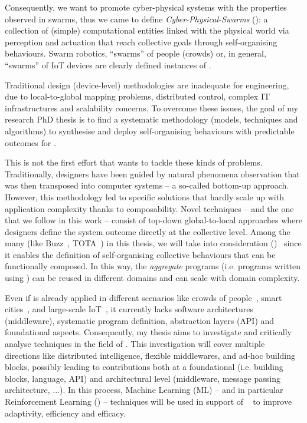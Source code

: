 \documentclass[11pt]{article}
\begin{document}
Consequently, we want to promote cyber-physical systems with the properties observed in swarms, thus we came to define \textit{Cyber-Physical-Swarms} (\cpsw{}): a collection of (simple) computational entities linked with the physical world via perception and actuation that reach collective goals through self-organising behaviours.
%
Swarm robotics, ``swarms” of people (crowds) or, in general, ``swarms” of IoT devices are clearly defined instances of \cpsw{}.

Traditional design (device-level) methodologies are inadequate for \cpsw{} engineering, due to local-to-global mapping problems, distributed control, complex IT infrastructures and scalability concerns.
%
To overcome these issues, the goal of my research PhD thesis is to find a systematic methodology (models, techniques and algorithms) to synthesise and deploy self-organising behaviours with predictable outcomes for \cpsw{}.

This is not the first effort that wants to tackle these kinds of problems. Traditionally, designers have been guided by natural phenomena observation that was then transposed into computer systems -- a so-called
bottom-up approach. However, this methodology led to specific solutions that hardly scale up with application complexity thanks to composability.
%
Novel techniques -- and the one that we follow in this work -- consist of top-down global-to-local approaches where designers define the system outcome directly at the collective level.
%
Among the many (like Buzz~\cite{DBLP:journals/software/PinciroliB16}, TOTA~\cite{DBLP:conf/icdcsw/MameiZL03}) in this thesis, we will take into consideration \textit{\acfull{}} (\ac{})~\cite{DBLP:journals/computer/BealPV15} since it enables the definition of self-organising collective behaviours that can be functionally composed. In this way, the \textit{aggregate} programs (i.e. programs written using \ac{}) can be reused in different domains and can scale with domain complexity. 

Even if \ac{} is already applied in different scenarios like crowds of people~\cite{DBLP:journals/computer/BealPV15}, smart cities~\cite{DBLP:journals/isci/CasadeiFPRSV19}, and large-scale IoT~\cite{DBLP:journals/fgcs/CasadeiFPRSV19}, it currently lacks software architectures (middleware), systematic program definition, abstraction layers (API) and foundational aspects.
%
Consequently, my thesis aims to investigate and critically analyse \acfull{} techniques in the field of \cpsw{}.
%
This investigation will cover multiple directions like distributed intelligence, flexible middlewares, and ad-hoc building blocks, possibly leading to contributions both at a foundational (i.e. building blocks, \ac{} language, API) and architectural level (middleware, message passing architecture, ...).
%
In this process, Machine Learning (ML) -- and in particular Reinforcement Learning (\rl{}) -- techniques will be used in support of \acfull{}~\cite{research} to improve adaptivity, efficiency and efficacy.
\end{document}
